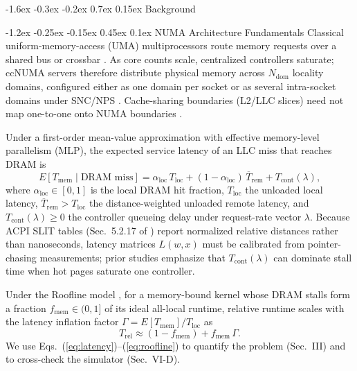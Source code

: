 \documentclass[10pt,twocolumn,letterpaper]{article}
\makeatletter
\renewcommand{\section}{\@startsection{section}{1}{\z@}%
  {-1.6ex \@plus -0.3ex \@minus -0.2ex}%
  {0.7ex \@plus 0.15ex}%
  {\normalfont\normalsize\centering\scshape}}
\renewcommand{\subsection}{\@startsection{subsection}{2}{\z@}%
  {-1.2ex \@plus -0.25ex \@minus -0.15ex}%
  {0.45ex \@plus 0.1ex}%
  {\normalfont\small\itshape}}
\makeatother
\begin{document}
\section{Background}

\subsection{NUMA Architecture Fundamentals}
Classical uniform-memory-access (UMA) multiprocessors route memory requests over a shared bus or crossbar \cite{ref20}. As core counts scale, centralized controllers saturate; ccNUMA servers therefore distribute physical memory across $N_{\mathrm{dom}}$ locality domains, configured either as one domain per socket or as several intra-socket domains under SNC/NPS \cite{ref21}. Cache-sharing boundaries (L2/LLC slices) need not map one-to-one onto NUMA boundaries \cite{ref22}.

Under a first-order mean-value approximation with effective memory-level parallelism (MLP), the expected service latency of an LLC miss that reaches DRAM is
\begin{equation}
E[T_{\mathrm{mem}} \mid \text{DRAM miss}] = \alpha_{\mathrm{loc}}\, T_{\mathrm{loc}} + (1 - \alpha_{\mathrm{loc}})\,\overline{T}_{\mathrm{rem}} + T_{\mathrm{cont}}(\lambda),
\label{eq:latency}
\end{equation}
where $\alpha_{\mathrm{loc}} \in [0,1]$ is the local DRAM hit fraction, $T_{\mathrm{loc}}$ the unloaded local latency, $\overline{T}_{\mathrm{rem}} > T_{\mathrm{loc}}$ the distance-weighted unloaded remote latency, and $T_{\mathrm{cont}}(\lambda) \ge 0$ the controller queueing delay under request-rate vector $\lambda$. Because ACPI SLIT tables (Sec.~5.2.17 of \cite{ref23}) report normalized relative distances rather than nanoseconds, latency matrices $L(w,x)$ must be calibrated from pointer-chasing measurements; prior studies \cite{ref24} emphasize that $T_{\mathrm{cont}}(\lambda)$ can dominate stall time when hot pages saturate one controller.

Under the Roofline model \cite{ref25}, for a memory-bound kernel whose DRAM stalls form a fraction $f_{\mathrm{mem}} \in (0,1]$ of its ideal all-local runtime, relative runtime scales with the latency inflation factor $\Gamma = E[T_{\mathrm{mem}}]/T_{\mathrm{loc}}$ as
\begin{equation}
T_{\mathrm{rel}} \approx (1 - f_{\mathrm{mem}}) + f_{\mathrm{mem}}\,\Gamma .
\label{eq:roofline}
\end{equation}
We use Eqs.~(\ref{eq:latency})--(\ref{eq:roofline}) to quantify the problem (Sec.~III) and to cross-check the simulator (Sec.~VI-D).
\end{document}
